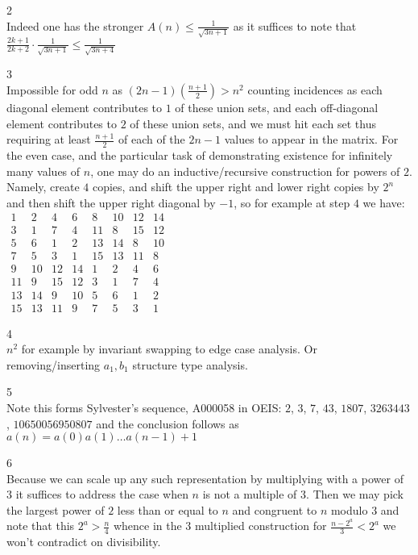 2 \\
Indeed one has the stronger $A(n) \le \frac{1}{\sqrt{3n+1}}$ as it suffices to note that $\frac{2k+1}{2k+2} \cdot \frac{1}{\sqrt{3n+1}} \le \frac{1}{\sqrt{3n+4}}$

3 \\
Impossible for odd $n$ as $(2n-1)\left(\frac{n+1}{2}\right) > n^2$ counting incidences as each diagonal element contributes to $1$ of these union sets, and each off-diagonal element contributes to $2$ of these union sets, and we must hit each set thus requiring at least $\frac{n+1}{2}$ of each of the $2n-1$ values to appear in the matrix. For the even case, and the particular task of demonstrating existence for infinitely many values of $n$, one may do an inductive/recursive construction for powers of $2$. Namely, create $4$ copies, and shift the upper right and lower right copies by $2^{n}$ and then shift the upper right diagonal by $-1$, so for example at step $4$ we have: \\
$
\begin{matrix}
1 & 2 & 4 & 6 & 8 & 10 & 12 & 14 \\
3 & 1 & 7 & 4 & 11 & 8 & 15 & 12 \\
5 & 6 & 1 & 2 & 13 & 14 & 8 & 10 \\
7 & 5 & 3 & 1 & 15 & 13 & 11 & 8 \\
9 & 10 & 12 & 14 & 1 & 2 & 4 & 6 \\
11 & 9 & 15 & 12 & 3 & 1 & 7 & 4 \\
13 & 14 & 9 & 10 & 5 & 6 & 1 & 2 \\
15 & 13 & 11 & 9 & 7 & 5 & 3 & 1
\end{matrix}
$

4 \\
$\boxed{n^2}$ for example by invariant swapping to edge case analysis. Or removing/inserting $a_1,b_1$ structure type analysis.

5 \\
Note this forms Sylvester's sequence, A000058 in OEIS: $2$, $3$, $7$, $43$, $1807$, $3263443$, $10650056950807$ and the conclusion follows as $a(n)=a(0)a(1)\dots a(n-1)+1$

6 \\
Because we can scale up any such representation by multiplying with a power of $3$ it suffices to address the case when $n$ is not a multiple of $3$. Then we may pick the largest power of $2$ less than or equal to $n$ and congruent to $n$ modulo $3$ and note that this $2^a > \frac{n}{4}$ whence in the $3$ multiplied construction for $\frac{n-2^a}{3} < 2^a$ we won't contradict on divisibility.

